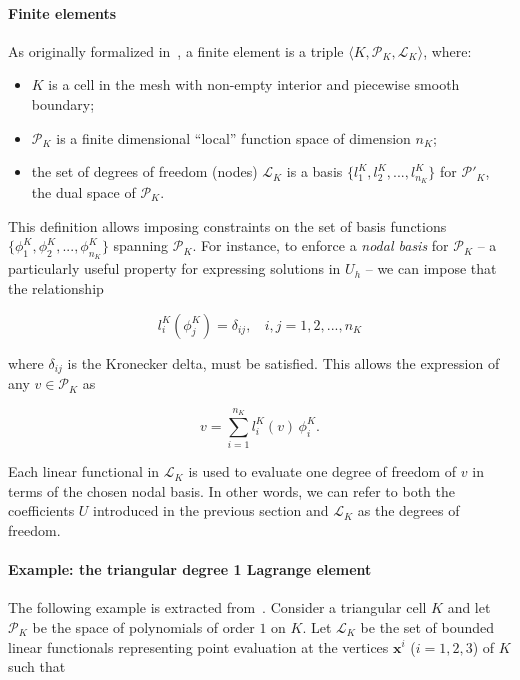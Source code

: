 \paragraph{Finite elements}
As originally formalized in~\cite{ciarlet-fem}, a finite element is a triple $\langle K,\mathcal{P}_K,\mathcal{L}_K \rangle$, where:
\begin{itemize}
\item $K$ is a cell in the mesh with non-empty interior and piecewise smooth boundary;
\item $\mathcal{P}_K$ is a finite dimensional ``local'' function space of dimension $n_K$;
\item the set of degrees of freedom (nodes) $\mathcal{L}_K$ is a basis $\lbrace l_1^K, l_2^K, ..., l_{n_K}^K\rbrace$ for $\mathcal{P}'_K$, the dual space of $\mathcal{P}_K$. 
\end{itemize}
This definition allows imposing constraints on the set of basis functions $\lbrace \phi_1^K, \phi_2^K, ..., \phi_{n_K}^K\rbrace$ spanning $\mathcal{P}_K$. For instance, to enforce a {\em nodal basis} for $\mathcal{P}_K$ -- a particularly useful property for expressing solutions in $U_h$ -- we can impose that the relationship

\begin{equation}
l_i^K(\phi_j^K) = \delta_{ij},\ \ \ \ i,j = 1,2,...,n_K
\end{equation}

where $\delta_{ij}$ is the Kronecker delta, must be satisfied. This allows the expression of any $v \in \mathcal{P}_K$ as

\begin{equation}
v = \sum_{i=1}^{n_K} l_i^K(v) \, \phi_i^K.
\end{equation}

Each linear functional in $\mathcal{L}_K$ is used to evaluate one degree of freedom of $v$ in terms of the chosen nodal basis. In other words, we can refer to both the coefficients $U$ introduced in the previous section and $\mathcal{L}_K$ as the degrees of freedom.

\paragraph{Example: the triangular degree 1 Lagrange element}
The following example is extracted from~\cite{Fenics}. Consider a triangular cell $K$ and let $\mathcal{P}_K$ be the space of polynomials of order $1$ on $K$. Let $\mathcal{L}_K$ be the set of bounded linear functionals representing point evaluation at the vertices $\boldsymbol{x}^i$ ($i=1,2,3$) of $K$ such that

